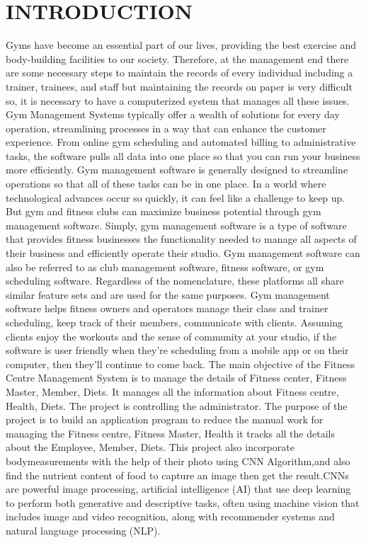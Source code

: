 \documentclass[a4paper,12pt,toc=flat]{report}
\begin{document}
	
	\chapter{INTRODUCTION}
	
	\hspace*{12pt}Gyms have become an essential part of our lives, providing the best exercise and body-building facilities to our society. Therefore, at the management end there are some necessary steps to maintain the records of every individual including a trainer, trainees, and staff but maintaining the records on paper is very difficult so, it is necessary to have a computerized system that manages all these issues. Gym Management Systems typically offer a wealth of solutions for every day operation, streamlining processes in a way that can enhance the customer experience. From online gym scheduling and automated billing to administrative tasks, the software pulls all data into one place so that you can run your business more efficiently. Gym management software is generally designed to streamline operations so that all of these tasks can be in one place. In a world where technological advances occur so quickly, it can feel like a challenge to keep up. But gym and fitness clubs can maximize business potential through gym management software. Simply, gym management software is a type of software that provides fitness businesses the functionality needed to manage all aspects of their business and efficiently operate their studio. Gym management software can also be referred to as club management software, fitness software, or gym scheduling software. Regardless of the nomenclature, these platforms all share similar feature sets and are used for the same purposes. Gym management software helps fitness owners and operators manage their class and trainer scheduling, keep track of their members, communicate with clients. Assuming clients enjoy the workouts and the sense of community at your studio, if the software is user friendly when they’re scheduling from a mobile app or on their computer, then they’ll continue to come back. The main objective of the Fitness Centre Management System is to manage the details of Fitness center, Fitness Master,  Member, Diets. It manages all the information about Fitness centre, Health, Diets. The project is controlling the administrator. The purpose of the project is to build an application program to reduce the manual work for managing the Fitness centre, Fitness Master, Health it tracks all the details about the Employee, Member, Diets. This project also incorporate bodymeasurements with the help of their photo using CNN Algorithm,and also find the nutrient content of food to capture an image then get the result.CNNs are powerful image processing, artificial intelligence (AI) that use deep learning to perform both generative and descriptive tasks, often using machine vision that includes image and video recognition, along with recommender systems and natural language processing (NLP). 
\end{document}
